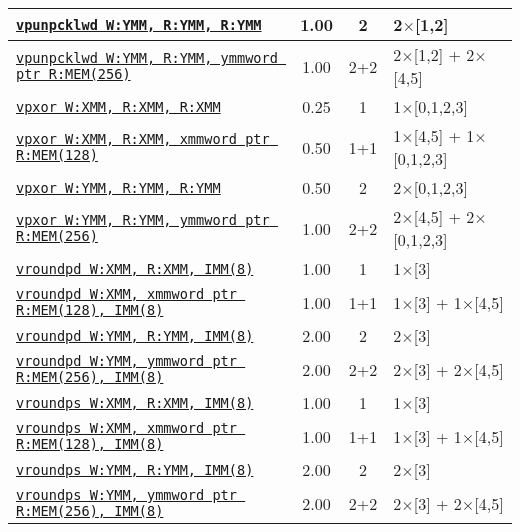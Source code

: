 \documentclass[a4paper,english,fontsize=9]{scrartcl}
\begin{document}
\begin{longtable}{p{}ccL{.25\textwidth}}
  \midrule
  \texttt{\href{https://felixcloutier.com/x86/PUNPCKLBW:PUNPCKLWD:PUNPCKLDQ:PUNPCKLQDQ.html}{vpunpcklwd W:YMM, R:YMM, R:YMM}} & 1.00 & 2 & 2\(\times\)[1,2] \\
  \midrule
  \texttt{\href{https://felixcloutier.com/x86/PUNPCKLBW:PUNPCKLWD:PUNPCKLDQ:PUNPCKLQDQ.html}{vpunpcklwd W:YMM, R:YMM, ymmword ptr R:MEM(256)}} & 1.00 & 2+2 & 2\(\times\)[1,2] + 2\(\times\)[4,5] \\
  \midrule
  \texttt{\href{https://felixcloutier.com/x86/PXOR.html}{vpxor W:XMM, R:XMM, R:XMM}} & 0.25 & 1 & 1\(\times\)[0,1,2,3] \\
  \midrule
  \texttt{\href{https://felixcloutier.com/x86/PXOR.html}{vpxor W:XMM, R:XMM, xmmword ptr R:MEM(128)}} & 0.50 & 1+1 & 1\(\times\)[4,5] + 1\(\times\)[0,1,2,3] \\
  \midrule
  \texttt{\href{https://felixcloutier.com/x86/PXOR.html}{vpxor W:YMM, R:YMM, R:YMM}} & 0.50 & 2 & 2\(\times\)[0,1,2,3] \\
  \midrule
  \texttt{\href{https://felixcloutier.com/x86/PXOR.html}{vpxor W:YMM, R:YMM, ymmword ptr R:MEM(256)}} & 1.00 & 2+2 & 2\(\times\)[4,5] + 2\(\times\)[0,1,2,3] \\
  \midrule
  \texttt{\href{https://felixcloutier.com/x86/ROUNDPD.html}{vroundpd W:XMM, R:XMM, IMM(8)}} & 1.00 & 1 & 1\(\times\)[3] \\
  \midrule
  \texttt{\href{https://felixcloutier.com/x86/ROUNDPD.html}{vroundpd W:XMM, xmmword ptr R:MEM(128), IMM(8)}} & 1.00 & 1+1 & 1\(\times\)[3] + 1\(\times\)[4,5] \\
  \midrule
  \texttt{\href{https://felixcloutier.com/x86/ROUNDPD.html}{vroundpd W:YMM, R:YMM, IMM(8)}} & 2.00 & 2 & 2\(\times\)[3] \\
  \midrule
  \texttt{\href{https://felixcloutier.com/x86/ROUNDPD.html}{vroundpd W:YMM, ymmword ptr R:MEM(256), IMM(8)}} & 2.00 & 2+2 & 2\(\times\)[3] + 2\(\times\)[4,5] \\
  \midrule
  \texttt{\href{https://felixcloutier.com/x86/ROUNDPS.html}{vroundps W:XMM, R:XMM, IMM(8)}} & 1.00 & 1 & 1\(\times\)[3] \\
  \midrule
  \texttt{\href{https://felixcloutier.com/x86/ROUNDPS.html}{vroundps W:XMM, xmmword ptr R:MEM(128), IMM(8)}} & 1.00 & 1+1 & 1\(\times\)[3] + 1\(\times\)[4,5] \\
  \midrule
  \texttt{\href{https://felixcloutier.com/x86/ROUNDPS.html}{vroundps W:YMM, R:YMM, IMM(8)}} & 2.00 & 2 & 2\(\times\)[3] \\
  \midrule
  \texttt{\href{https://felixcloutier.com/x86/ROUNDPS.html}{vroundps W:YMM, ymmword ptr R:MEM(256), IMM(8)}} & 2.00 & 2+2 & 2\(\times\)[3] + 2\(\times\)[4,5] \\

\end{longtable}
\end{document}
